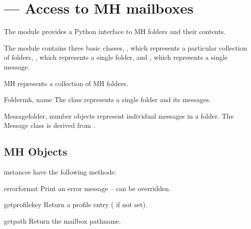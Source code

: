
\section{ ---
         Access to MH mailboxes}



The  module provides a Python interface to MH folders and
their contents.

The module contains three basic classes, , which represents a
particular collection of folders, , which represents a single
folder, and , which represents a single message.


\begin{classdesc}{MH}{}
 represents a collection of MH folders.
\end{classdesc}

\begin{classdesc}{Folder}{mh, name}
The  class represents a single folder and its messages.
\end{classdesc}

\begin{classdesc}{Message}{folder, number}
 objects represent individual messages in a folder.  The
Message class is derived from .
\end{classdesc}


\subsection{MH Objects \label{mh-objects}}

 instances have the following methods:


\begin{methoddesc}[MH]{error}{format}
Print an error message -- can be overridden.
\end{methoddesc}

\begin{methoddesc}[MH]{getprofile}{key}
Return a profile entry ( if not set).
\end{methoddesc}

\begin{methoddesc}[MH]{getpath}{}
Return the mailbox pathname.
\end{methoddesc}

